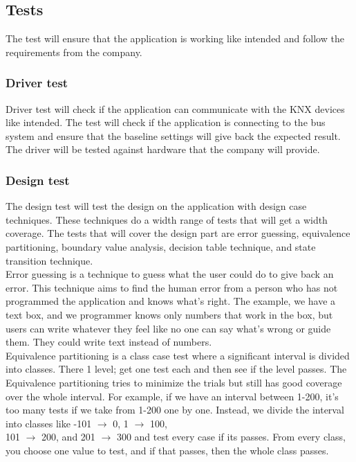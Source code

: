 \documentclass{article}
\begin{document}
\subsection{Tests}
The test will ensure that the application is working like intended and follow the requirements from the company. 
\subsubsection{Driver test}
Driver test will check if the application can communicate with the KNX devices like intended.  The test will check if the application is connecting to the bus system and ensure that the baseline settings will give back the expected result. The driver will be tested against hardware that the company will provide. 
\subsubsection{Design test}
The design test will test the design on the application with design case techniques. These techniques do a width 
range of tests that will get a width coverage. The tests that will cover the design part are error 
guessing, equivalence partitioning, boundary value analysis, decision table technique, and state transition technique.\\

Error guessing is a technique to guess what the user could do to give back an error. This technique aims to find the human error from a person who has not programmed the application and knows what's right. The example, we have a text box, and we programmer knows only numbers that work in the box, but users can write whatever they feel like no one can say what's wrong or guide them. They could write text instead of numbers.\\

Equivalence partitioning is a class case test where a significant interval is divided into classes. There 1 level; get one test each and then see if the level passes. The Equivalence partitioning tries to minimize the trials but still has good coverage over the whole interval. For example, if we have an interval between 1-200, it's too many tests if we take from 1-200 one by one.
Instead, we divide the interval into classes like -101 $\rightarrow$ 0, 1 $\rightarrow$ 100,\\101 $\rightarrow$ 200, and 201 $\rightarrow$ 300 and test every case if its passes. From every class, you choose one value to test, and if that passes, then the whole class passes.\\
\end{document}
